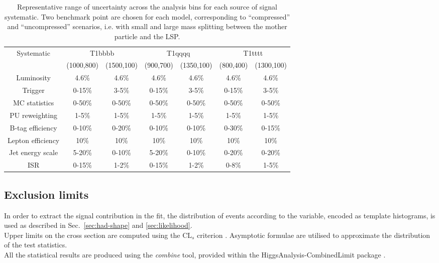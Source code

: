 \begin{table}[h!]
  \caption{Representative range of uncertainty across the analysis bins 
    for each source of signal systematic.
    Two benchmark point are chosen for each model, 
    corresponding to ``compressed'' and ``uncompressed'' scenarios, 
    i.e. with small and large mass splitting between the mother particle and the LSP.
  }
  \label{tab:sig-systematics}
  \centering
  \begin{tabular}{ ccccccc }
    \hline
    \hline
    Systematic & \multicolumn{2}{c}{T1bbbb} & \multicolumn{2}{c}{T1qqqq} & \multicolumn{2}{c}{T1tttt}  \\ 
                      & (1000,800) & (1500,100) & (900,700) & (1350,100) & (800,400) & (1300,100) \\
    \hline
    Luminosity        & 4.6\%      & 4.6\%      & 4.6\%     & 4.6\%   & 4.6\%      & 4.6\%     \\ \hline
    Trigger           & 0-15\%     & 3-5\%      & 0-15\%    & 3-5\%   & 0-15\%     & 3-5\%     \\ \hline
    MC statistics     & 0-50\%     & 0-50\%     & 0-50\%    & 0-50\%  & 0-50\%     & 0-50\%    \\ \hline
    PU reweighting    & 1-5\%      & 1-5\%      & 1-5\%     & 1-5\%   & 1-5\%      & 1-5\%     \\ \hline
    B-tag efficiency  & 0-10\%     & 0-20\%     & 0-10\%    & 0-10\%  & 0-30\%     & 0-15\%    \\ \hline
    Lepton efficiency & 10\%       & 10\%       & 10\%      & 10\%    & 10\%       & 10\%      \\ \hline
    Jet energy scale  & 5-20\%     & 0-10\%     & 5-20\%    & 0-10\%  & 0-20\%     & 0-20\%    \\ \hline
    ISR               & 0-15\%     & 1-2\%      & 0-15\%    & 1-2\%   & 0-8\%     & 1-5\%     \\
    \hline
    \hline
  \end{tabular}
\end{table}



\subsection{Exclusion limits}
\label{sec:susy_results}

In order to extract the signal contribution in the fit, the distribution of events according to the \mht variable, 
encoded as template histograms, is used as described in Sec.~\ref{sec:had-shape} and \ref{sec:likelihood}. \\
Upper limits on the cross section are computed using the $\text{CL}_{s}$ criterion \cite{CLsTechnique}. 
Asymptotic formulae \cite{AsymptoticFormulae} are utilised to approximate the distribution of the test statistics. \\
All the statistical results are produced using the \textit{combine} tool, 
provided within the HiggsAnalysis-CombinedLimit package \cite{Combine}. 

